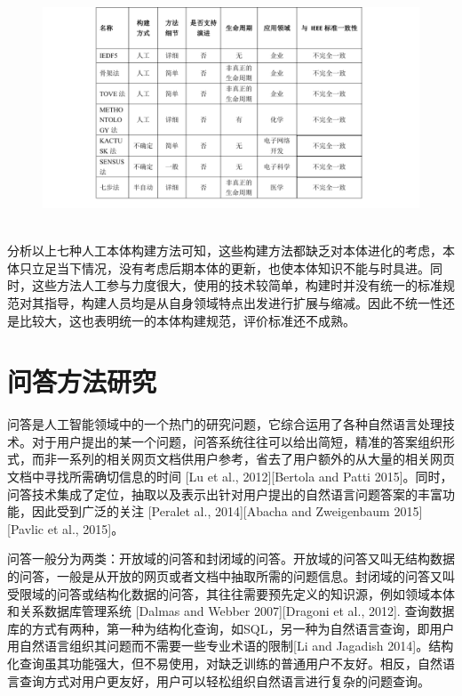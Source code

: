 \begin{figure}[!htb]
	\centering\includegraphics[height=7cm]{resource/onto_method_compare}
	\label{fig:onto_method_compare}
\end{figure}

分析以上七种人工本体构建方法可知，这些构建方法都缺乏对本体进化的考虑，本体只立足当下情况，没有考虑后期本体的更新，也使本体知识不能与时具进。同时，这些方法人工参与力度很大，使用的技术较简单，构建时并没有统一的标准规范对其指导，构建人员均是从自身领域特点出发进行扩展与缩减。因此不统一性还是比较大，这也表明统一的本体构建规范，评价标准还不成熟。

\section{问答方法研究}
问答是人工智能领域中的一个热门的研究问题，它综合运用了各种自然语言处理技术。对于用户提出的某一个问题，问答系统往往可以给出简短，精准的答案组织形式，而非一系列的相关网页文档供用户参考，省去了用户额外的从大量的相关网页文档中寻找所需确切信息的时间 [Lu et al., 2012][Bertola and Patti 2015]。同时，问答技术集成了定位，抽取以及表示出针对用户提出的自然语言问题答案的丰富功能，因此受到广泛的关注 [Peralet al., 2014][Abacha and Zweigenbaum 2015][Pavlic et al., 2015]。

问答一般分为两类：开放域的问答和封闭域的问答。开放域的问答又叫无结构数据的问答，一般是从开放的网页或者文档中抽取所需的问题信息。封闭域的问答又叫受限域的问答或结构化数据的问答，其往往需要预先定义的知识源，例如领域本体和关系数据库管理系统 [Dalmas and Webber 2007][Dragoni et al., 2012]. 查询数据库的方式有两种，第一种为结构化查询，如SQL，另一种为自然语言查询，即用户用自然语言组织其问题而不需要一些专业术语的限制[Li and Jagadish 2014]。结构化查询虽其功能强大，但不易使用，对缺乏训练的普通用户不友好。相反，自然语言查询方式对用户更友好，用户可以轻松组织自然语言进行复杂的问题查询。

